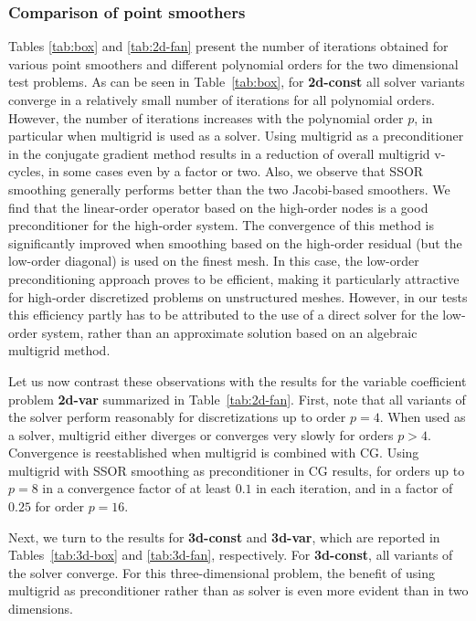 \documentclass[smallcondensed,final]{svjour3}     %
\begin{document}
\subsubsection{Comparison of point smoothers}\label{subsec:num_point}
Tables \ref{tab:box} and \ref{tab:2d-fan} present the number of
iterations obtained for various point smoothers and different
polynomial orders for the two dimensional test problems. As can be
seen in Table~\ref{tab:box}, for {\bf 2d-const}
all solver variants converge in a
relatively small number of iterations for all polynomial
orders. However, the number of
iterations increases with the polynomial order $p$, in particular when
multigrid is used as a solver. Using multigrid as a preconditioner in
the conjugate gradient method results in a reduction of overall
multigrid v-cycles, in some cases even by a factor or two. Also, we
observe that SSOR smoothing generally performs better than the two
Jacobi-based smoothers. We find that the linear-order operator based
on the high-order nodes is a good preconditioner for the high-order
system. The convergence of this method is significantly improved when
smoothing based on the high-order residual (but the low-order
diagonal) is used on the finest mesh.
In this case, the low-order preconditioning approach proves to
be efficient, making it particularly attractive for high-order
discretized problems on unstructured meshes. However, in our tests
this efficiency partly has to be attributed to the use of a direct
solver for the low-order system, rather than an approximate solution
based on an algebraic multigrid method.

Let us now contrast these observations with the results for the
variable coefficient problem {\bf 2d-var} summarized in Table~\ref{tab:2d-fan}. First,
note that all variants of the solver perform reasonably for discretizations up to
order $p=4$. When used as a solver, multigrid either diverges or
converges very slowly for orders $p>4$. Convergence is reestablished
when multigrid is combined with CG. Using multigrid with SSOR
smoothing as preconditioner in CG results, for orders up to $p=8$ in a
convergence factor of at least $0.1$ in each iteration, and in a
factor of $0.25$ for order $p=16$.

Next, we turn to the results for {\bf 3d-const} and {\bf 3d-var},
which are reported in Tables~\ref{tab:3d-box} and \ref{tab:3d-fan},
respectively. For {\bf 3d-const}, all variants of the solver
converge. For this three-dimensional problem, the benefit of using
multigrid as preconditioner rather than as solver is even more evident
than in two dimensions.
\end{document}
